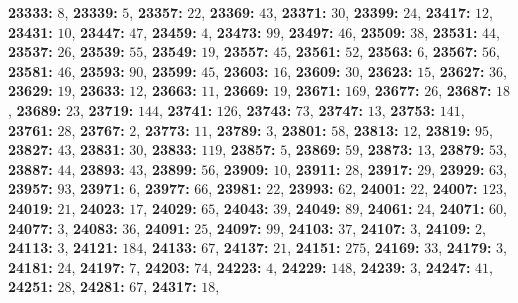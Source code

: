 \textsf{\bfseries 23333:} $8$, \textsf{\bfseries 23339:} $5$, \textsf{\bfseries 23357:} $22$, \textsf{\bfseries 23369:} $43$, \textsf{\bfseries 23371:} $30$, \textsf{\bfseries 23399:} $24$, \textsf{\bfseries 23417:} $12$, \textsf{\bfseries 23431:} $10$, \textsf{\bfseries 23447:} $47$, \textsf{\bfseries 23459:} $4$, \textsf{\bfseries 23473:} $99$, \textsf{\bfseries 23497:} $46$, \textsf{\bfseries 23509:} $38$, \textsf{\bfseries 23531:} $44$, \textsf{\bfseries 23537:} $26$, \textsf{\bfseries 23539:} $55$, \textsf{\bfseries 23549:} $19$, \textsf{\bfseries 23557:} $45$, \textsf{\bfseries 23561:} $52$, \textsf{\bfseries 23563:} $6$, \textsf{\bfseries 23567:} $56$, \textsf{\bfseries 23581:} $46$, \textsf{\bfseries 23593:} $90$, \textsf{\bfseries 23599:} $45$, \textsf{\bfseries 23603:} $16$, \textsf{\bfseries 23609:} $30$, \textsf{\bfseries 23623:} $15$, \textsf{\bfseries 23627:} $36$, \textsf{\bfseries 23629:} $19$, \textsf{\bfseries 23633:} $12$, \textsf{\bfseries 23663:} $11$, \textsf{\bfseries 23669:} $19$, \textsf{\bfseries 23671:} $169$, \textsf{\bfseries 23677:} $26$, \textsf{\bfseries 23687:} $18$, \textsf{\bfseries 23689:} $23$, \textsf{\bfseries 23719:} $144$, \textsf{\bfseries 23741:} $126$, \textsf{\bfseries 23743:} $73$, \textsf{\bfseries 23747:} $13$, \textsf{\bfseries 23753:} $141$, \textsf{\bfseries 23761:} $28$, \textsf{\bfseries 23767:} $2$, \textsf{\bfseries 23773:} $11$, \textsf{\bfseries 23789:} $3$, \textsf{\bfseries 23801:} $58$, \textsf{\bfseries 23813:} $12$, \textsf{\bfseries 23819:} $95$, \textsf{\bfseries 23827:} $43$, \textsf{\bfseries 23831:} $30$, \textsf{\bfseries 23833:} $119$, \textsf{\bfseries 23857:} $5$, \textsf{\bfseries 23869:} $59$, \textsf{\bfseries 23873:} $13$, \textsf{\bfseries 23879:} $53$, \textsf{\bfseries 23887:} $44$, \textsf{\bfseries 23893:} $43$, \textsf{\bfseries 23899:} $56$, \textsf{\bfseries 23909:} $10$, \textsf{\bfseries 23911:} $28$, \textsf{\bfseries 23917:} $29$, \textsf{\bfseries 23929:} $63$, \textsf{\bfseries 23957:} $93$, \textsf{\bfseries 23971:} $6$, \textsf{\bfseries 23977:} $66$, \textsf{\bfseries 23981:} $22$, \textsf{\bfseries 23993:} $62$, \textsf{\bfseries 24001:} $22$, \textsf{\bfseries 24007:} $123$, \textsf{\bfseries 24019:} $21$, \textsf{\bfseries 24023:} $17$, \textsf{\bfseries 24029:} $65$, \textsf{\bfseries 24043:} $39$, \textsf{\bfseries 24049:} $89$, \textsf{\bfseries 24061:} $24$, \textsf{\bfseries 24071:} $60$, \textsf{\bfseries 24077:} $3$, \textsf{\bfseries 24083:} $36$, \textsf{\bfseries 24091:} $25$, \textsf{\bfseries 24097:} $99$, \textsf{\bfseries 24103:} $37$, \textsf{\bfseries 24107:} $3$, \textsf{\bfseries 24109:} $2$, \textsf{\bfseries 24113:} $3$, \textsf{\bfseries 24121:} $184$, \textsf{\bfseries 24133:} $67$, \textsf{\bfseries 24137:} $21$, \textsf{\bfseries 24151:} $275$, \textsf{\bfseries 24169:} $33$, \textsf{\bfseries 24179:} $3$, \textsf{\bfseries 24181:} $24$, \textsf{\bfseries 24197:} $7$, \textsf{\bfseries 24203:} $74$, \textsf{\bfseries 24223:} $4$, \textsf{\bfseries 24229:} $148$, \textsf{\bfseries 24239:} $3$, \textsf{\bfseries 24247:} $41$, \textsf{\bfseries 24251:} $28$, \textsf{\bfseries 24281:} $67$, \textsf{\bfseries 24317:} $18$, 
